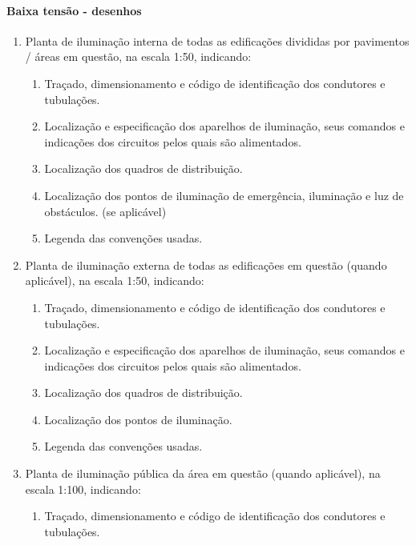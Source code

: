 \paragraph{Baixa tensão - desenhos}
\begin{enumerate}
	
	\item Planta de iluminação interna de todas as edificações divididas por pavimentos / áreas em questão, na escala 1:50, indicando:
	\begin{enumerate}
		\item Traçado, dimensionamento e código de identificação dos condutores e tubulações.
		
		\item Localização e especificação dos aparelhos de iluminação, seus comandos e indicações dos circuitos pelos quais são alimentados.
		
		\item Localização dos quadros de distribuição.
		
		\item Localização dos pontos de iluminação de emergência, iluminação e luz de obstáculos. (se aplicável)
		
		\item Legenda das convenções usadas.
		
	\end{enumerate}
	
	\item Planta de iluminação externa de todas as edificações em questão (quando aplicável), na escala 1:50, indicando:
	\begin{enumerate}
		\item Traçado, dimensionamento e código de identificação dos condutores e tubulações.
		
		\item Localização e especificação dos aparelhos de iluminação, seus comandos e indicações dos circuitos pelos quais são alimentados.
		
		\item Localização dos quadros de distribuição.
		
		\item Localização dos pontos de iluminação.
		
		\item Legenda das convenções usadas.
	\end{enumerate}
	
	\item Planta de iluminação pública da área em questão (quando aplicável), na escala 1:100, indicando:
	\begin{enumerate}
		\item Traçado, dimensionamento e código de identificação dos condutores e tubulações.
		

\end{enumerate}
\end{enumerate}
